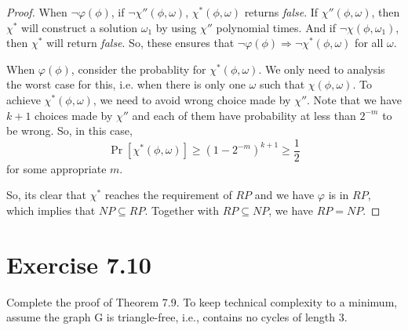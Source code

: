 \documentclass{article}
\begin{document}
\begin{proof}
  When $\lnot\varphi(\phi)$, if $\lnot\chi''(\phi, \omega)$, $\chi^*(\phi,\omega)$ returns \textit{false}.
  If $\chi''(\phi,\omega)$, then $\chi^*$ will construct a solution $\omega_1$ by using $\chi''$ polynomial times.
  And if $\lnot\chi(\phi,\omega_1)$, then $\chi^*$ will return \textit{false}.
  So, these ensures that $\lnot\varphi(\phi) \Rightarrow \lnot\chi^*(\phi, \omega)$ for all $\omega$.

  When $\varphi(\phi)$, consider the probablity for $\chi^*(\phi, \omega)$.
  We only need to analysis the worst case for this, i.e. when there is only one $\omega$ such that $\chi(\phi,\omega)$.
  To achieve $\chi^*(\phi,\omega)$, we need to avoid wrong choice made by $\chi''$.
  Note that we have $k+1$ choices made by $\chi''$ and each of them have probability at less than $2^{-m}$ to be wrong.
  So, in this case,
    \[\Pr[\chi^*(\phi, \omega)] \geq (1-2^{-m})^{k+1} \geq \frac{1}{2}\]
  for some appropriate $m$.

  So, its clear that $\chi^*$ reaches the requirement of $RP$ and we have $\varphi$ is in $RP$,
  which implies that $NP\subseteq RP$.
  Together with $RP\subseteq NP$, we have $RP = NP$.
\end{proof}

\section{Exercise 7.10}
Complete the proof of Theorem 7.9. To keep technical complexity to a minimum, assume the graph G is triangle-free, i.e., contains no cycles of length 3.
\end{document}
